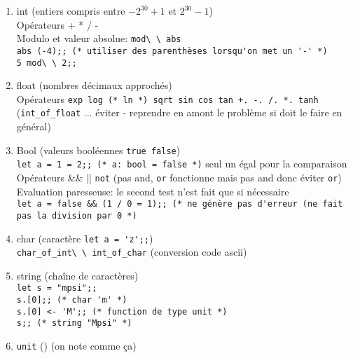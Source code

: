 \documentclass{article}
\newcommand{\code}[1]{\lstinline[style = mystyle]{#1}}
\begin{document}
						\begin{enumerate}
							\item int (entiers compris entre $-2^{30} + 1$ et $2^{30} - 1$)\\
								Opérateurs + * / -\\
								Modulo et valeur absolue: \code{mod\ \ abs}\\
								\code{abs (-4);; (* utiliser des parenthèses lorsqu'on met un '-' *)}\\
								\code{5 mod\ \ 2;;} %
								
							\item float (nombres décimaux approchés)\\
								Opérateurs \code{exp log (* ln *) sqrt sin cos tan +. -. /. *. tanh}\\
								(\code{int_of_float} ... éviter - reprendre en amont le problème si doit le faire en général)\\
								
							\item Bool (valeurs booléennes \code{true false})\\
								\code{let a = 1 = 2;; (* a: bool = false *)} seul un égal pour la comparaison\\
								Opérateurs \&\& || \code{not} (pas and, \code{or} fonctionne mais pas and donc éviter \code{or})\\
								Evaluation paresseuse: le second test n'est fait que si nécessaire\\
								\code{let a = false && (1 / 0 = 1);; (* ne génère pas d'erreur (ne fait pas la division par 0 *)}
							
							\item char (caractère \code{let a = 'z';;})\\
								\code{char_of_int\ \ int_of_char} (conversion code ascii)
							
							\item string (chaîne de caractères)\\
								\code{let s = "mpsi";;}\\
								\code{s.[0];; (* char 'm' *)}\\
								\code{s.[0] <- 'M';; (* function de type unit *)}\\
								\code{s;; (* string "Mpsi" *)}
							
							\item \code{unit} () (on note comme ça)
								
						\end{enumerate}
					
\end{document}
